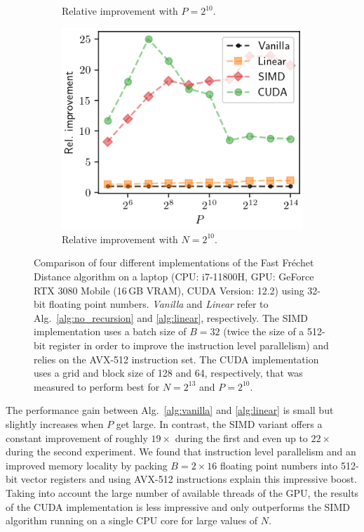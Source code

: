 \begin{figure}[htbp]
\begin{subfigure}{.49\textwidth}
        \caption{Relative improvement with $P = 2^{10}$.}
    \end{subfigure}
    \begin{subfigure}{.49\textwidth}
        \includegraphics[width=.8\textwidth]{img/laptop/rel_performance-pP.png}
        \caption{Relative improvement with $N = 2^{10}$.}
    \end{subfigure}
    \caption{Comparison of four different implementations of the Fast Fr\'echet Distance algorithm on a laptop (CPU: i7-11800H, GPU: GeForce RTX 3080 Mobile (16\,GB VRAM), CUDA Version: 12.2) using 32-bit floating point numbers. \textit{Vanilla} and \textit{Linear} refer to Alg.~\ref{alg:no_recursion} and \ref{alg:linear}, respectively. The SIMD implementation uses a batch size of $B = 32$ (twice the size of a 512-bit register in order to improve the instruction level parallelism) and relies on the AVX-512 instruction set. The CUDA implementation uses a grid and block size of 128 and 64, respectively, that was measured to perform best for $N=2^{13}$ and $P=2^{10}$.}
    \label{fig:benchmark_laptop}
\end{figure}

The performance gain between Alg.~\ref{alg:vanilla} and \ref{alg:linear} is small but slightly increases when $P$ get large.
In contrast, the SIMD variant offers a constant improvement of roughly $19\times$ during the first and even up to $22\times$ during the second experiment.
We found that instruction level parallelism and an improved memory locality by packing $B=2 \times 16$ floating point numbers into 512-bit vector registers and using AVX-512 instructions explain this impressive boost.
Taking into account the large number of available threads of the GPU, the results of the CUDA implementation is less impressive and only outperforms the SIMD algorithm running on a single CPU core for large values of $N$.

